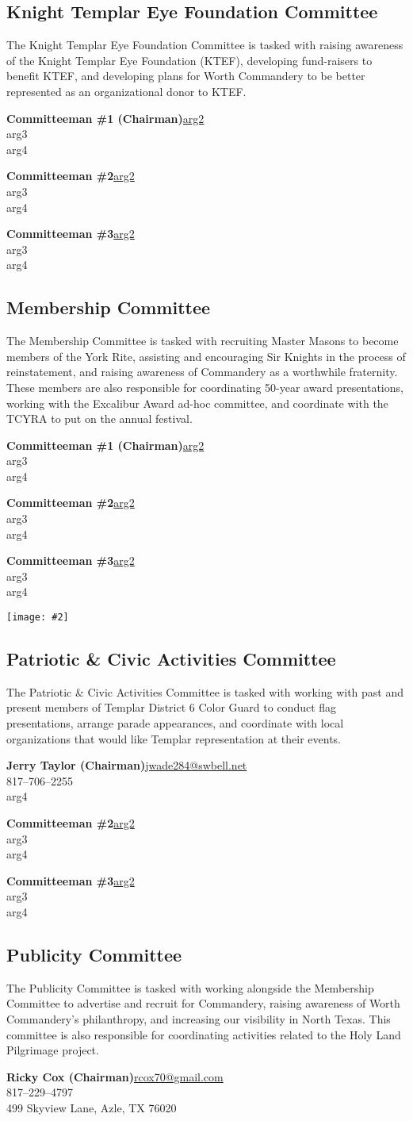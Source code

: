 \documentclass[letterpaper]{article}
\newcommand{\cman}[4]{\textbf{#1}\hfill{}\url{#2}\\\hphantom{0em}\hfill{}#3\\\hphantom{0em}\hfill{}#4}
\newcommand{\comm}[3]{\subsection*{#1 Committee\textsuperscript{#2}}The #1 Committee is tasked with #3}
\newcommand{\mand}{\CrossMaltese}
\newcommand{\gantt}[2]{
	\begin{sidewaysfigure}[]
		\centering
		\caption{#1}
		\texttt{[image: \#2]}
	\end{sidewaysfigure}
}
\begin{document}
	\comm{Knight Templar Eye Foundation}{\mand}{raising awareness of the Knight Templar Eye Foundation (KTEF), developing fund-raisers to benefit KTEF, and developing plans for Worth Commandery to be better represented as an organizational donor to KTEF.}
	
		\cman{Committeeman \#1 (Chairman)}{arg2}{arg3}{arg4}
		
		\cman{Committeeman \#2}{arg2}{arg3}{arg4}
		
		\cman{Committeeman \#3}{arg2}{arg3}{arg4}
	
	\pagebreak
		
	\comm{Membership}{\mand}{recruiting Master Masons to become members of the York Rite, assisting and encouraging Sir Knights in the process of reinstatement, and raising awareness of Commandery as a worthwhile fraternity. These members are also responsible for coordinating 50-year award presentations, working with the Excalibur Award ad-hoc committee, and coordinate with the TCYRA to put on the annual festival.}
	
		\cman{Committeeman \#1 (Chairman)}{arg2}{arg3}{arg4}
		
		\cman{Committeeman \#2}{arg2}{arg3}{arg4}
		
		\cman{Committeeman \#3}{arg2}{arg3}{arg4}
	
	\gantt{Task Timelines for Membership Committee}{2021GanttMembership.pdf}
	
	\pagebreak
	
	\comm{Patriotic \& Civic Activities}{\mand}{working with past and present members of Templar District \textnumero{} 6 Color Guard to conduct flag presentations, arrange parade appearances, and coordinate with local organizations that would like Templar representation at their events.}
	
		\cman{Jerry Taylor (Chairman)}{jwade284@swbell.net}{817--706--2255}{arg4}
		
		\cman{Committeeman \#2}{arg2}{arg3}{arg4}
		
		\cman{Committeeman \#3}{arg2}{arg3}{arg4}
	
	\pagebreak
	
	\comm{Publicity}{\mand}{working alongside the Membership Committee to advertise and recruit for Commandery, raising awareness of Worth Commandery's philanthropy, and increasing our visibility in North Texas. This committee is also responsible for coordinating activities related to the Holy Land Pilgrimage project.}
	
		\cman{Ricky Cox (Chairman)}{rcox70@gmail.com}{817--229--4797}{499 Skyview Lane, Azle, TX 76020}
		
\end{document}
